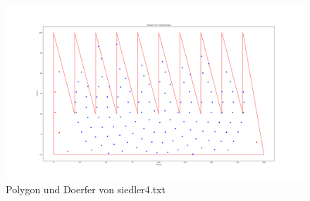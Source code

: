 \documentclass{article}
\begin{document}
\newpage
\begin{figure}[h]
    \centering
    \includegraphics[width=1\textwidth]{Bilder/Figure_4.png}
    \caption{Polygon und Doerfer von siedler4.txt}
    \label{fig:example}
\end{figure}
\end{document}
